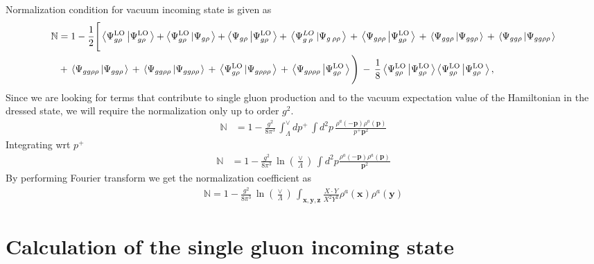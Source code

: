 \documentclass[aps,prd,amsmath,amssymb,nofootinbib]{revtex4-2}
\def\mf#1{\mathbb{#1}}
\def\v#1{\mathbf{#1}}
\numberwithin{equation}{section}
\begin{document}
Normalization condition for vacuum incoming state is given as
\begin{align}
    \mf{N} & = 1-\frac{1}{2}\Bigg[\left\langle \Psi_{g\rho}^{\text{LO}}\left|\Psi_{g\rho}^{\text{LO}}\right.\right\rangle + \left\langle \Psi_{g\rho}^{\text{LO}}\left|\Psi_{g\rho}\right.\right\rangle +\left\langle \Psi_{g\rho}\left|\Psi_{g\rho}^{\text{LO}}\right.\right\rangle +\,\left\langle \Psi_{g\:\rho}^{LO}\left|\Psi_{g\:\rho\rho}\right.\right\rangle \,+\,\left\langle \Psi_{g\rho\rho}\left|\Psi_{g\rho}^{\text{LO}}\right.\right\rangle \,+\,\left\langle \Psi_{gg\rho}\left|\Psi_{gg\rho}\right.\right\rangle \,+\,\left\langle \Psi_{gg\rho}\left|\Psi_{gg\rho\rho}\right.\right\rangle \notag \\ & +\,\left\langle \Psi_{gg\rho\rho}\left|\Psi_{gg\rho}\right.\right\rangle\,+\,\left\langle \Psi_{gg\rho\rho}\left|\Psi_{gg\rho\rho}\right.\right\rangle \,+\,\left\langle \Psi_{g\rho}^{\text{LO}}\left|\Psi_{g\rho\rho\rho}\right.\right\rangle \,+\,\left\langle \Psi_{g\rho\rho\rho}\left|\Psi_{g\rho}^{\text{LO}}\right.\right\rangle \Bigg)\,-\,\frac{1}{8}\left\langle \Psi_{g\rho}^{\text{LO}}\left|\Psi_{g\rho}^{\text{LO}}\right.\right\rangle \left\langle \Psi_{g\rho}^{\text{LO}}\left|\Psi_{g\rho}^{\text{LO}}\right.\right\rangle,
\end{align}
Since we are looking for terms that contribute to single gluon production and to the vacuum expectation value of the Hamiltonian in the dressed state, we will require the normalization only up to order $g^{2}$.
\begin{align}\label{normmom}
    \mf{N} & = 1- \frac{g^2}{8 \pi^3 }\, \int_{\Lambda}^{\vee} dp^{+}\,
  \int d^2p\, \frac{\rho^a(-\v{p}) \rho^a(\v{p})}{p^{+}\v{p}^2}
\end{align}
Integrating wrt $p^{+}$
\begin{align}
\mf{N} & =  
 1 - \frac{g^2}{8 \pi^3 }\,\ln\left(\frac{\vee}{\Lambda}\right)\,
\int d^2p \frac{\rho^a(-\v{p}) \rho^a(\v{p})}{\v{p}^2}
\end{align}
By performing Fourier transform we get the normalization coefficient as
\begin{align}\label{normpos}
\mf{N} =  
 1 - \frac{g^2}{8 \pi^3 }\,\ln\left(\frac{\vee}{\Lambda}\right)\, 
  \int_{\v{x}, \v{y},\v{z}} \frac{X\cdot Y}{X^2 Y^2}   \rho^a(\v{x}) \rho^a(\v{y})
\end{align}
\section{Calculation of the single gluon incoming state}\label{sec:singleglue}
\end{document}
